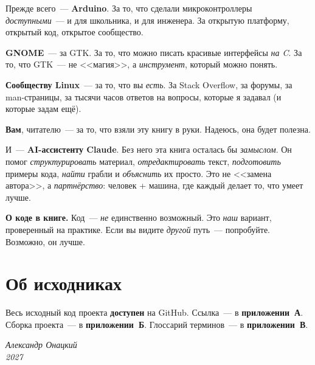 Прежде всего~--- \textbf{Arduino}. За то, что сделали
микроконтроллеры \emph{доступными}~--- и для школьника,
и для инженера. За открытую платформу, открытый код,
открытое сообщество.

\textbf{GNOME}~--- за GTK. За то, что можно писать
красивые интерфейсы \emph{на C}. За то, что GTK~---
не <<магия>>, а \emph{инструмент}, который можно
понять.

\textbf{Сообществу Linux}~--- за то, что вы \emph{есть}.
За Stack Overflow, за форумы, за man-страницы, за тысячи
часов ответов на вопросы, которые я задавал (и которые
задам ещё).

\textbf{Вам}, читателю~--- за то, что взяли эту книгу
в руки. Надеюсь, она будет полезна.

И~--- \textbf{AI-ассистенту Claude}. Без него эта книга
осталась бы \emph{замыслом}. Он помог \emph{структурировать}
материал, \emph{отредактировать} текст, \emph{подготовить}
примеры кода, \emph{найти} грабли и \emph{объяснить}
их просто. Это не <<замена автора>>, а \emph{партнёрство}:
человек + машина, где каждый делает то, что умеет лучше.

\begin{notebox}
\textbf{О коде в книге.} Код~--- \emph{не} единственно
возможный. Это \emph{наш} вариант, проверенный на практике.
Если вы видите \emph{другой} путь~--- попробуйте. Возможно,
он лучше.
\end{notebox}

\section*{Об исходниках}

Весь исходный код проекта \textbf{доступен} на GitHub.
Ссылка~--- в \textbf{приложении~А}. Сборка проекта~---
в \textbf{приложении~Б}. Глоссарий терминов~---
в \textbf{приложении~В}.

\vspace{1cm}

\begin{flushright}
\itshape
Александр Онацкий\\
\upshape\small 2027
\end{flushright}